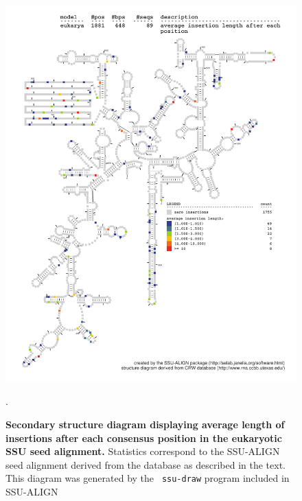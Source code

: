 \begin{figure}
\begin{center}
\includegraphics[width=5.7in]{Figures/eukarya-0p1-iavglen}
\end{center}
\caption[Secondary structure diagram displaying average length of insertions
  after each consensus position in the eukaryotic SSU seed
  alignment]{\textbf{Secondary structure diagram displaying average
    length of insertions after each consensus position in the eukaryotic SSU seed
  alignment.} Statistics correspond to the SSU-ALIGN seed
  alignment derived from the  database \cite{CannoneGutell02}
  as described in the text. This diagram was generated by the {\tt
  ssu-draw} program included in SSU-ALIGN}.
\label{fig:eukiavglen}
\end{figure}

